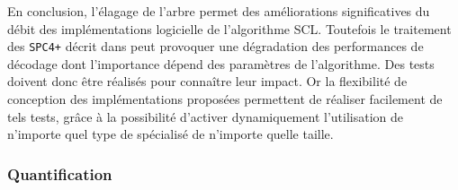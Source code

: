En conclusion, l'élagage de l'arbre permet des améliorations significatives du débit des implémentations logicielle de l'algorithme SCL. Toutefois le traitement des \noeuds \texttt{SPC4+} décrit dans \cite{sarkis_fast_2016} peut provoquer une dégradation des performances de décodage dont l'importance dépend des paramètres de l'algorithme. Des tests doivent donc être réalisés pour connaître leur impact. Or la flexibilité de conception des implémentations proposées permettent de réaliser facilement de tels tests, grâce à la possibilité d'activer dynamiquement l'utilisation de n'importe quel type de \noeud spécialisé de n'importe quelle taille.

\subsubsection{Quantification}


